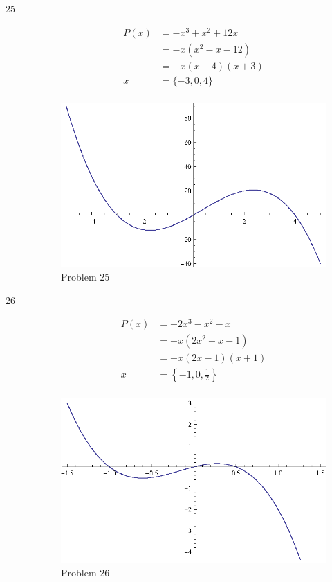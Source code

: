 \documentclass{exam}
\begin{document}
\begin{description}
    \item[25] 
      \begin{align*}
        P(x) &= -x^3 + x^2 + 12x \\
             &= -x(x^2 - x - 12) \\
             &= -x(x - 4)(x + 3) \\
        x    &= \{ -3, 0, 4 \} \\
      \end{align*}
      
      \begin{figure}[H]
        \centering
        \includegraphics[scale=0.9]{problem25.eps}
        \caption*{Problem 25}
      \end{figure}

    \item[26] 
      \begin{align*}
        P(x) &= -2x^3 - x^2 - x \\
             &= -x(2x^2 - x - 1) \\
             &= -x(2x - 1)(x + 1) \\
        x    &= \left\{ -1, 0, \frac{1}{2} \right\} \\
      \end{align*}
      
      \begin{figure}[H]
        \centering
        \includegraphics[scale=0.9]{problem26.eps}
        \caption*{Problem 26}
      \end{figure}


\end{description}
\end{document}
